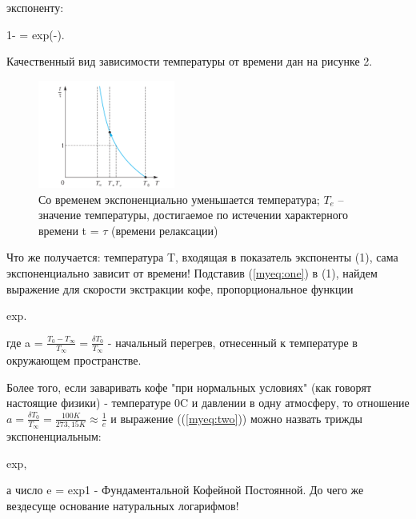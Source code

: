 \newpage
\begin{multicols}{2}
	\setlength{\belowcaptionskip}{-10pt}
    \noindent
    экспоненту:

	\begin{myequation}\label{myeq:one}
		1- = exp(-).	
	\end{myequation}
    
    \noindent
    Качественный вид зависимости температуры от времени дан на рисунке 2.
    \begin{figure}[H]
    	\centering\offinterlineskip
    	\includegraphics[width=0.4\textwidth]{pic1.png}
    	\caption{Со временем экспоненциально уменьшается температура; $T_e$
    		– значение температуры, достигаемое по истечении характерного
    		времени t = $\tau$ (времени релаксации)}
    \end{figure}

    Что же получается: температура T, входящая в показатель экспоненты (1), сама экспоненциально зависит от времени! Подставив (\ref{myeq:one}) в (1), найдем выражение для скорости экстракции кофе, пропорциональное функции
    \begin{myequation}\label{myeq:two}
    	exp.
    \end{myequation}
	\noindent
    где a = $\frac{T_0 - T_\infty}{T_\infty} = \frac{\delta T_0}{T_\infty}$ - начальный перегрев,
    отнесенный к температуре в окружающем пространстве.
    
    Более того, если заваривать кофе "при нормальных условиях" (как говорят настоящие физики) - температуре 
    0\degree C и давлении в одну атмосферу, то отношение $a = \frac{\delta T_0}{T_\infty} = \frac{100 K}{273,15 K} \approx
    \frac{1}{e}$ и выражение ((\ref{myeq:two})) можно назвать трижды экспоненциальным:
    \begin{myequation}\label{myeq:three}
    	exp,
    \end{myequation}
	а число e = exp1 - Фундаментальной Кофейной Постоянной. До чего же вездесуще основание натуральных логарифмов!\columnbreak
	

\end{multicols}
